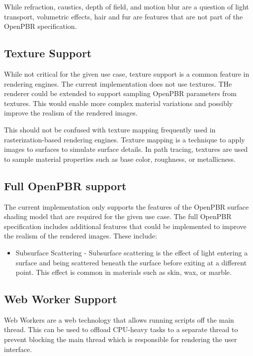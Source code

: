 While refraction, caustics, depth of field, and motion blur are a question of light transport, volumetric effects, hair and fur are features that are not part of the \gls{OpenPBR} specification.

\subsection*{Texture Support}

While not critical for the given use case, texture support is a common feature in rendering engines. The current implementation does not use textures. THe renderer could be extended to support sampling \gls{OpenPBR} parameters from textures. This would enable more complex material variations and possibly improve the realism of the rendered images.

This should not be confused with texture mapping frequently used in rasterization-based rendering engines. Texture mapping is a technique to apply images to surfaces to simulate surface details. In path tracing, textures are used to sample material properties such as base color, roughness, or metallicness.

\subsection*{Full OpenPBR support}

The current implementation only supports the features of the \gls{OpenPBR} surface shading model that are required for the given use case. The full \gls{OpenPBR} specification includes additional features that could be implemented to improve the realism of the rendered images. These include:

\begin{itemize}
    \item{Subsurface Scattering} - Subsurface scattering is the effect of light entering a surface and being scattered beneath the surface before exiting at a different point. This effect is common in materials such as skin, wax, or marble.
\end{itemize}


\subsection*{Web Worker Support}

Web Workers are a web technology that allows running scripts off the main thread. This can be used to offload \gls{CPU}-heavy tasks to a separate thread to prevent blocking the main thread which is responsible for rendering the user interface.

